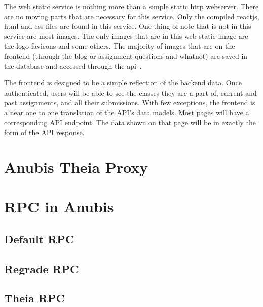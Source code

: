 The web static service is nothing more than a simple static http webserver.
There are no moving parts that are necessary for this service.
Only the compiled reactjs, html and css files are found in this service.
One thing of note that is not in this service are most images.
The only images that are in this web static image are the logo favicons
and some others.
The majority of images that are on the frontend (through the blog or assignment questions and whatnot)
are saved in the database and accessed through the api~.

The frontend is designed to be a simple reflection of the backend data.
Once authenticated, users will be able to see the classes they are a part of, 
current and past assignments, and all their submissions. 
With few exceptions, the frontend is a near one to one translation of the API's data models.
Most pages will have a corresponding API endpoint. 
The data shown on that page will be in exactly the form of the API response.

\section{Anubis Theia Proxy}\label{sec:theia-proxy}

\section{RPC in Anubis}\label{sec:rpc-in-anubis}

\subsection{Default RPC}\label{sec:default-rpc}

\subsection{Regrade RPC}\label{sec:regrade-rpc}

\subsection{Theia RPC}\label{sec:theia-rpc}

